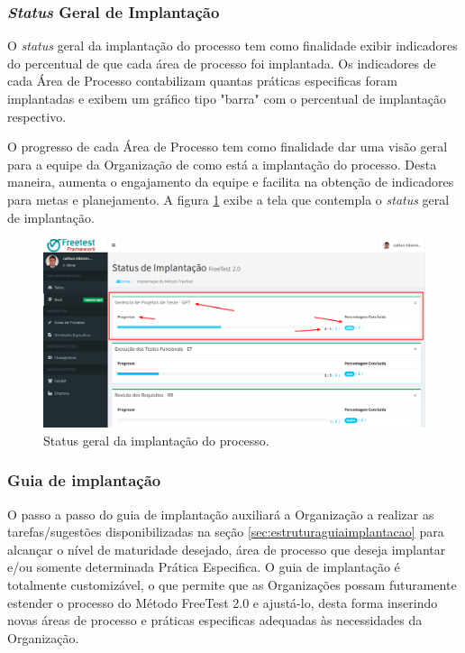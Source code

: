 \subsubsection{\textit{Status} Geral de Implantação}
\label{sec:statusimplantacao}

O \textit{status} geral da implantação do processo tem como finalidade exibir indicadores do percentual de que cada área de processo foi implantada. Os indicadores de cada Área de Processo contabilizam quantas práticas especificas foram implantadas e exibem um gráfico tipo "barra" com o percentual de implantação respectivo.

O progresso de cada Área de Processo tem como finalidade dar uma visão geral para a equipe da Organização de como está a implantação do processo. Desta maneira, aumenta o engajamento da equipe e facilita na obtenção de indicadores para metas e planejamento. A figura \ref{fig:fig68} exibe a tela que contempla o \textit{status} geral de implantação.

\begin{figure}[H]
\centering
\includegraphics[width=.90\textwidth]{fig/figura68.png}
\caption{Status geral da implantação do processo.}
\label{fig:fig68}
\end{figure}

\subsubsection{Guia de implantação}
\label{sec:passoapassoguia}

O passo a passo do guia de implantação auxiliará a Organização a realizar as tarefas/sugestões disponibilizadas na seção \ref{sec:estruturaguiaimplantacao} para alcançar o nível de maturidade desejado, área de processo que deseja implantar e/ou somente determinada Prática Especifica. O guia de implantação é totalmente customizável, o que permite que as Organizações possam futuramente estender o processo do Método FreeTest 2.0 e ajustá-lo, desta forma inserindo novas áreas de processo e práticas especificas adequadas às necessidades da Organização.

